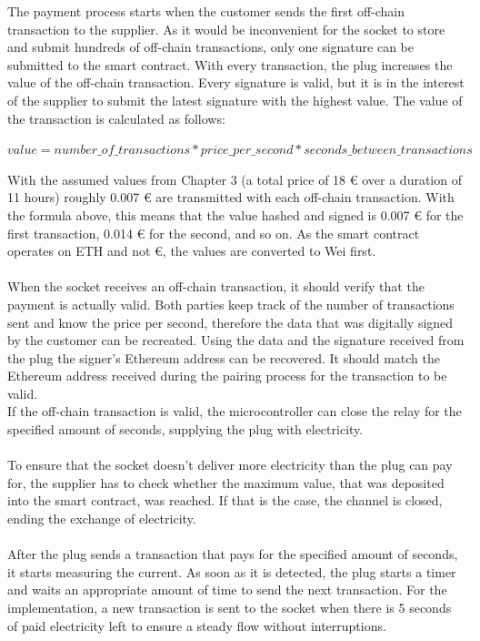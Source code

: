 The payment process starts when the customer sends the first off-chain transaction to the supplier.
As it would be inconvenient for the socket to store and submit hundreds of off-chain transactions, only one signature can be submitted to the smart contract.
With every transaction, the plug increases the value of the off-chain transaction.
Every signature is valid, but it is in the interest of the supplier to submit the latest signature with the highest value.
The value of the transaction is calculated as follows:
\begin{center}
$value = number\_of\_transactions * price\_per\_second * seconds\_between\_transactions$
\end{center}
With the assumed values from Chapter 3 (a total price of 18 \euro{} over a duration of 11 hours) roughly 0.007 \euro{} are transmitted with each off-chain transaction.
With the formula above, this means that the value hashed and signed is 0.007 \euro{} for the first transaction, 0.014 \euro{} for the second, and so on.
As the smart contract operates on ETH and not \euro, the values are converted to Wei first.
\\\\
When the socket receives an off-chain transaction, it should verify that the payment is actually valid.
Both parties keep track of the number of transactions sent and know the price per second, therefore the data that was digitally signed by the customer can be recreated.
Using the data and the signature received from the plug the signer's Ethereum address can be recovered.
It should match the Ethereum address received during the pairing process for the transaction to be valid.
\\
If the off-chain transaction is valid, the microcontroller can close the relay for the specified amount of seconds, supplying the plug with electricity.
\\\\
To ensure that the socket doesn’t deliver more electricity than the plug can pay for, the supplier has to check whether the maximum value, that was deposited into the smart contract, was reached.
If that is the case, the channel is closed, ending the exchange of electricity.
\\\\
After the plug sends a transaction that pays for the specified amount of seconds, it starts measuring the current.
As soon as it is detected, the plug starts a timer and waits an appropriate amount of time to send the next transaction.
For the implementation, a new transaction is sent to the socket when there is 5 seconds of paid electricity left to ensure a steady flow without interruptions.
